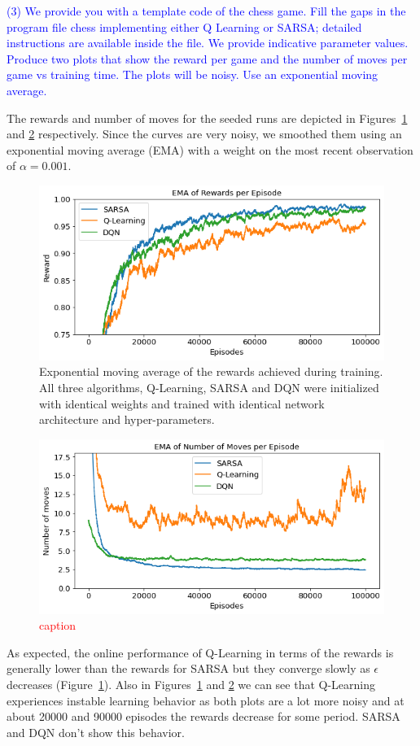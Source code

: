 \documentclass[conference]{IEEEtran}
\begin{document}
\textcolor{blue}{(3) We provide you with a template code of the chess game. Fill the gaps in the
program file chess implementing either Q Learning or SARSA; detailed instructions
are available inside the file. We provide indicative parameter values. Produce two
plots that show the reward per game and the number of moves per game vs training
time. The plots will be noisy. Use an exponential moving average.}


The rewards and number of moves for the seeded runs are depicted in Figures~\ref{fig:rewards} and \ref{fig:n_moves} respectively. Since the curves are very noisy, we smoothed them using an exponential moving average (EMA) with a weight on the most recent observation of $\alpha = 0.001$.


\begin{figure}
    \centering
    \includegraphics[width=.49\textwidth]{../figures/ema_rewards_per_episode_comparison.png}
    \caption{Exponential moving average of the rewards achieved during training. All three algorithms, Q-Learning, SARSA and DQN were initialized with identical weights and trained with identical network architecture and hyper-parameters.}
    \label{fig:rewards}
\end{figure}

\begin{figure}
    \centering
    \includegraphics[width=.49\textwidth]{../figures/ema_number_of_moves_per_episode_comparison.png}
    \caption{\textcolor{red}{caption}}
    \label{fig:n_moves}
\end{figure}


As expected, the online performance of Q-Learning in terms of the rewards is generally lower than the rewards for SARSA but they converge slowly as $\epsilon$ decreases (Figure~\ref{fig:rewards}). Also in Figures~\ref{fig:rewards} and \ref{fig:n_moves} we can see that Q-Learning experiences instable learning behavior as both plots are a lot more noisy and at about 20000 and 90000 episodes the rewards decrease for some period. SARSA and DQN don't show this behavior.
\end{document}
